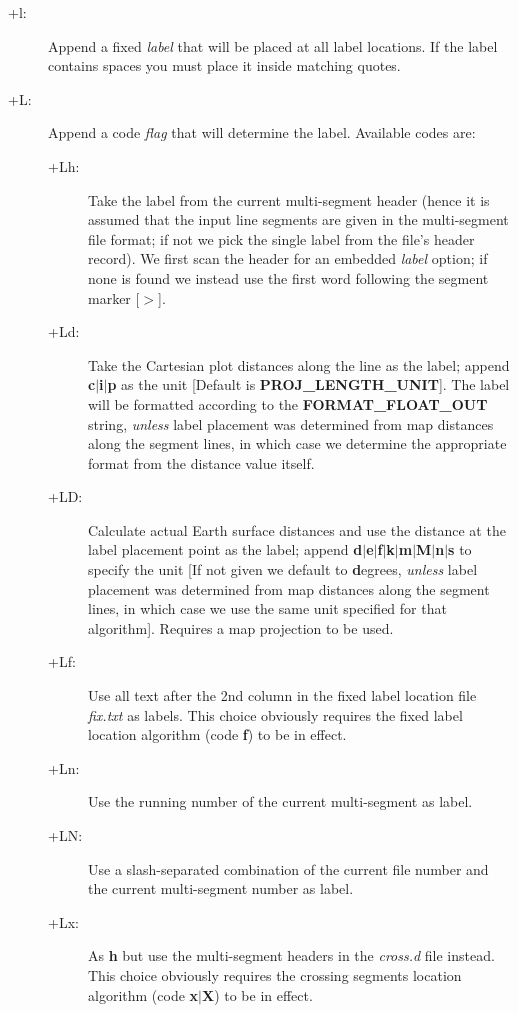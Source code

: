 \begin{description}
\item [+l:] Append a fixed \emph{label} that will be placed at all label locations.  If the label contains
spaces you must place it inside matching quotes.
\item [+L:] Append a code \emph{flag} that will determine the label.  Available codes are:
\begin{description}
\item [+Lh:]  Take the label from the current multi-segment header (hence it is assumed that the
input line segments are given in the multi-segment file format; if not we pick the single label
from the file's header record).  We first scan the header for an embedded
\emph{label} option; if none is found we instead use the first word following the segment marker [$>$].
\item [+Ld:] Take the Cartesian plot distances along the line as the label; append \textbf{c$|$i$|$p}
as the unit [Default is \textbf{PROJ\_LENGTH\_UNIT}].  The label will be formatted according to the \textbf{FORMAT\_FLOAT\_OUT}
string, \emph{unless} label placement was determined from map distances along the segment lines, in which
case we determine the appropriate format from the distance value itself. 
\item [+LD:]  Calculate actual Earth surface distances and use the distance at the label placement point as
the label; append \textbf{d$|$e$|$f$|$k$|$m$|$M$|$n$|$s} to specify the unit [If not given we default to \textbf{d}egrees,
\emph{unless} label placement was determined from map distances along the segment lines, in which case we
use the same unit specified for that algorithm].  Requires a map projection to be used.
\item [+Lf:]  Use all text after the 2nd column in the fixed label location file \emph{fix.txt} as labels.
This choice obviously requires the fixed label location algorithm (code \textbf{f}) to be in effect.
\item [+Ln:]  Use the running number of the current multi-segment as label.
\item [+LN:]  Use a slash-separated combination of the current file number and the current multi-segment number as label.
\item [+Lx:]  As \textbf{h} but use the multi-segment headers in the \emph{cross.d} file instead.
This choice obviously requires the crossing segments location algorithm (code \textbf{x$|$X}) to be in effect.
\end{description}
\end{description}

